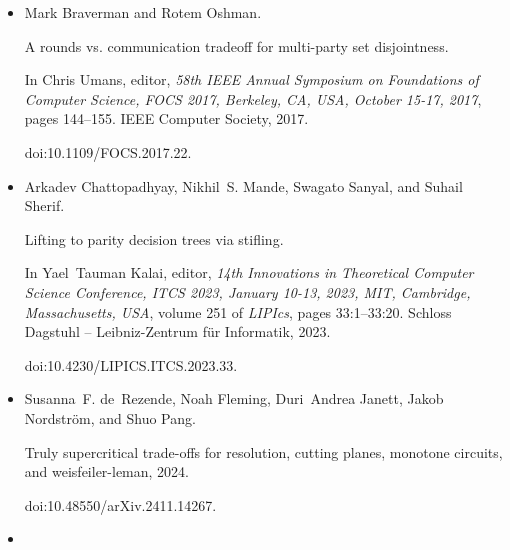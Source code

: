 \documentclass[10pt,a4paper]{article}
\begin{document}
\begin{itemize}
Exponential Separation Between Powers of Regular and General
Resolution over Parities.


In Rahul Santhanam, editor, \emph{39th Computational Complexity
Conference (CCC 2024)}, volume 300 of \emph{Leibniz International Proceedings
in Informatics (LIPIcs)}, pages 23:1–23:32, Dagstuhl, Germany, 2024. Schloss
Dagstuhl – Leibniz-Zentrum für Informatik.


doi:10.4230/LIPIcs.CCC.2024.23.





\item[] 
[10]

Mark Braverman and Rotem Oshman.


A rounds vs. communication tradeoff for multi-party set disjointness.


In Chris Umans, editor, \emph{58th IEEE Annual Symposium on
Foundations of Computer Science, FOCS 2017, Berkeley, CA, USA, October
15-17, 2017}, pages 144–155. IEEE Computer Society, 2017.


doi:10.1109/FOCS.2017.22.





\item[] 
[11]

Arkadev Chattopadhyay, Nikhil S. Mande, Swagato Sanyal, and Suhail Sherif.


Lifting to parity decision trees via stifling.


In Yael Tauman Kalai, editor, \emph{14th Innovations in Theoretical
Computer Science Conference, ITCS 2023, January 10-13, 2023, MIT,
Cambridge, Massachusetts, USA}, volume 251 of \emph{LIPIcs}, pages
33:1–33:20. Schloss Dagstuhl – Leibniz-Zentrum für Informatik, 2023.


doi:10.4230/LIPICS.ITCS.2023.33.





\item[] 
[12]

Susanna F. de Rezende, Noah Fleming, Duri Andrea Janett, Jakob Nordström, and
Shuo Pang.


Truly supercritical trade-offs for resolution, cutting planes,
monotone circuits, and weisfeiler-leman, 2024.


doi:10.48550/arXiv.2411.14267.





\item[] 
[13]


\end{itemize}
\end{document}
